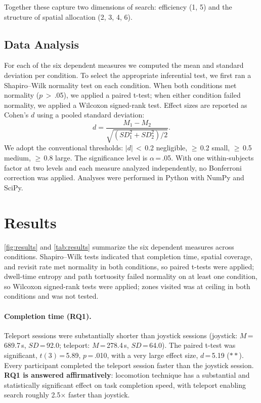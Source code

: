 \documentclass{vgtc}
\begin{document}
\noindent Together these capture two dimensions of search: efficiency (1, 5) and the structure of spatial allocation (2, 3, 4, 6).

\subsection{Data Analysis}
For each of the six dependent measures we computed the mean and standard deviation per condition. To select the appropriate inferential test, we first ran a Shapiro--Wilk normality test on each condition. When both conditions met normality ($p$\,$>$\,.05), we applied a paired t-test; when either condition failed normality, we applied a Wilcoxon signed-rank test. Effect sizes are reported as Cohen's $d$ using a pooled standard deviation:
\[
d = \frac{M_1 - M_2}{\sqrt{(SD_1^2 + SD_2^2)/2}}.
\]
We adopt the conventional thresholds: $|d|$\,$<$\,0.2 negligible, $\geq$\,0.2 small, $\geq$\,0.5 medium, $\geq$\,0.8 large. The significance level is $\alpha$\,=\,.05. With one within-subjects factor at two levels and each measure analyzed independently, no Bonferroni correction was applied. Analyses were performed in Python with NumPy and SciPy.

\section{Results}
\label{sec:results}

\autoref{fig:results} and \autoref{tab:results} summarize the six dependent measures across conditions. Shapiro--Wilk tests indicated that completion time, spatial coverage, and revisit rate met normality in both conditions, so paired t-tests were applied; dwell-time entropy and path tortuosity failed normality on at least one condition, so Wilcoxon signed-rank tests were applied; zones visited was at ceiling in both conditions and was not tested.

\paragraph{Completion time (RQ1).}
Teleport sessions were substantially shorter than joystick sessions (joystick: $M$\,=\,689.7\,s, $SD$\,=\,92.0; teleport: $M$\,=\,278.4\,s, $SD$\,=\,64.0). The paired t-test was significant, $t(3)$\,=\,5.89, $p$\,=\,.010, with a very large effect size, $d$\,=\,5.19 ($\ast\ast$). Every participant completed the teleport session faster than the joystick session. \textbf{RQ1 is answered affirmatively}: locomotion technique has a substantial and statistically significant effect on task completion speed, with teleport enabling search roughly 2.5$\times$ faster than joystick.
\end{document}
